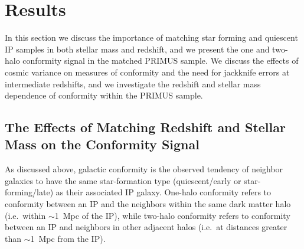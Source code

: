 
\section{Results}\label{sec:results}

In this section we discuss the importance of matching star forming and quiescent IP 
samples in both stellar mass and redshift, and we present the one and two-halo 
conformity signal in the matched PRIMUS sample.  We discuss the effects of 
cosmic variance on measures of conformity and the need for jackknife
errors at intermediate redshifts, and we investigate the redshift and stellar mass 
dependence of conformity within the PRIMUS sample.

\subsection{The Effects of Matching Redshift and Stellar Mass on the Conformity Signal}\label{sec:LTfraction}

As discussed above, galactic conformity is the observed tendency of neighbor 
galaxies to have the same star-formation type (quiescent/early or star-forming/late) 
as their associated IP galaxy.
One-halo conformity refers to conformity between an IP and the neighbors within the 
same dark matter halo (i.e.~within $\sim$1~Mpc of the IP),
while two-halo conformity refers to conformity between an IP and neighbors in other 
adjacent halos (i.e.~at distances greater than $\sim$1~Mpc from the IP).

